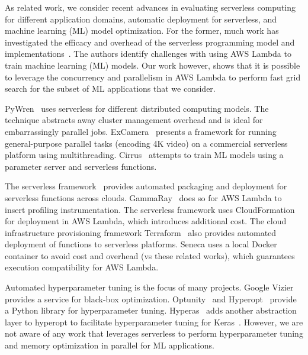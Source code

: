 As related work, we consider recent advances
in evaluating serverless computing for different application domains, 
automatic deployment for serverless, and machine learning (ML) model optimization. 
For the former, much work has investigated the efficacy and overhead of the
serverless programming model and 
implementations~\cite{ref:jonas2017occupy,ref:onesteptwostep,ref:baldini2017,ref:lin2018tracking}.
The authors identify challenges with 
using AWS Lambda to train machine learning (ML) models.
Our work however, shows that it is possible to leverage the concurrency 
and parallelism in AWS Lambda to perform fast grid search for the
subset of ML applications that we consider.

PyWren~\cite{ref:jonas2017occupy} uses serverless for
different distributed computing models. The technique abstracts away cluster management overhead and is ideal for embarrassingly parallel jobs.
ExCamera~\cite{ref:encoding} presents a framework for running general-purpose parallel tasks (encoding 4K video) on a commercial serverless platform using multithreading. Cirrus~\cite{ref:jonas2019cloud} attempts to train ML models using a parameter server and serverless functions. 

The serverless framework~\cite{ref:serverless_framework} provides
automated packaging and deployment for serverless functions across clouds. 
GammaRay~\cite{gammaray18} does so for AWS Lambda to insert profiling instrumentation.
The serverless framework uses 
CloudFormation~\cite{ref:cloudformation} for deployment in AWS Lambda, which introduces additional cost. 
The cloud infrastructure provisioning 
framework Terraform~\cite{ref:terraform}
also provides automated deployment of functions to serverless platforms.
Seneca uses a local Docker container to avoid  cost and overhead (vs these related
works), which guarantees execution compatibility for AWS Lambda. 

Automated hyperparameter tuning is the focus of
many projects. Google Vizier~\cite{ref:vizier} provides a service for 
black-box optimization. Optunity~\cite{ref:claesen2014hyperparameter} 
and Hyperopt~\cite{ref:hyperopt}
provide a Python library for hyperparameter tuning. 
Hyperas~\cite{ref:hyperas} adds another 
abstraction layer to hyperopt to facilitate hyperparameter tuning for 
Keras~\cite{ref:keras}. However, we are not aware of any work that
leverages serverless to perform hyperparameter tuning and memory
optimization in parallel for ML applications.

